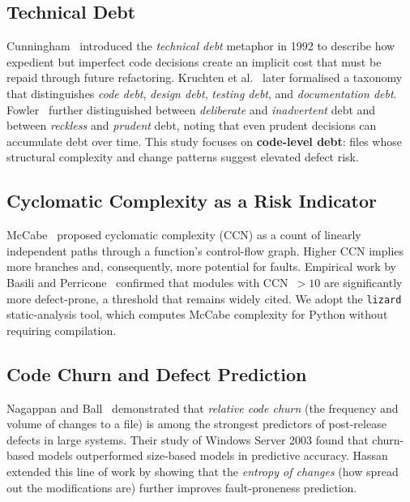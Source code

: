 \documentclass[12pt,a4paper]{article}
\begin{document}
\subsection{Technical Debt}

Cunningham~\cite{cunningham1992} introduced the \emph{technical debt} metaphor in 1992 to describe how expedient but imperfect code decisions create an implicit cost that must be repaid through future refactoring.
Kruchten et al.~\cite{kruchten2012} later formalised a taxonomy that distinguishes \emph{code debt}, \emph{design debt}, \emph{testing debt}, and \emph{documentation debt}.
Fowler~\cite{fowler2009} further distinguished between \emph{deliberate} and \emph{inadvertent} debt and between \emph{reckless} and \emph{prudent} debt, noting that even prudent decisions can accumulate debt over time.
This study focuses on \textbf{code-level debt}: files whose structural complexity and change patterns suggest elevated defect risk.

\subsection{Cyclomatic Complexity as a Risk Indicator}

McCabe~\cite{mccabe1976} proposed cyclomatic complexity (CCN) as a count of linearly independent paths through a function's control-flow graph.
Higher CCN implies more branches and, consequently, more potential for faults.
Empirical work by Basili and Perricone~\cite{basili1984} confirmed that modules with CCN~$>10$ are significantly more defect-prone, a threshold that remains widely cited.
We adopt the \texttt{lizard} static-analysis tool, which computes McCabe complexity for Python without requiring compilation.

\subsection{Code Churn and Defect Prediction}

Nagappan and Ball~\cite{nagappan2005} demonstrated that \emph{relative code churn} (the frequency and volume of changes to a file) is among the strongest predictors of post-release defects in large systems.
Their study of Windows Server 2003 found that churn-based models outperformed size-based models in predictive accuracy.
Hassan~\cite{hassan2009} extended this line of work by showing that the \emph{entropy of changes} (how spread out the modifications are) further improves fault-proneness prediction.
\end{document}
